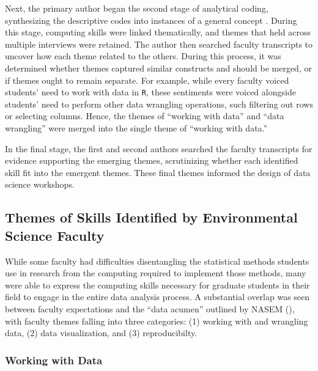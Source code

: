 \documentclass[12pt]{article}
\begin{document}
\quad Next, the primary author began the second stage of analytical coding,
synthesizing the descriptive codes into instances of a general concept 
\citep[p.\ 95]{miles}. During this stage, computing skills were linked
thematically, and themes that held across multiple interviews were retained.
The author then searched faculty transcripts to uncover how each theme related
to the others. During this process, it was determined whether themes captured
similar constructs and should be merged, or if themes ought to remain separate. 
For example, while every faculty voiced students' need to work with data in 
\texttt{R}, these sentiments were voiced alongside students' need to perform
other data wrangling operations, such filtering out rows or selecting columns. 
Hence, the themes of ``working with data'' and ``data wrangling'' were merged
into the single theme of ``working with data.'' 


\quad In the final stage, the first and second authors searched the faculty
transcripts for evidence supporting the emerging themes, scrutinizing whether
each identified skill fit into the emergent themes. 
These final themes informed the design of data science workshops. 

\subsection{Themes of Skills Identified by Environmental Science Faculty}

\noindent While some faculty had difficulties disentangling the statistical
methods students use in research from the computing required to implement those
methods, many were able to express the computing skills necessary for graduate
students in their field to engage in the entire data analysis process. A
substantial overlap was seen between faculty expectations and the ``data
acumen'' outlined by NASEM (\citeyear{nas}), with faculty themes falling into
three categories: (1) working with and wrangling data, (2) data visualization,
and (3) reproducibilty. 

\subsubsection{Working with Data}  
\end{document}
